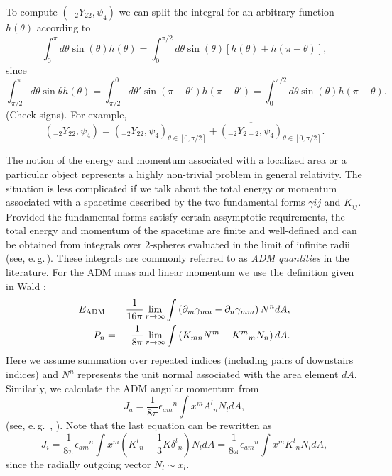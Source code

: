 \documentclass[12pt]{article}
\newcommand{\beq}{\begin{equation}}
\newcommand{\eeq}{\end{equation}}
\newcommand{\mysec}[1]{\bigskip\noindent{\bf #1}\smallskip}
\begin{document}
To compute $(\mbox{}_{-2}Y_{22}, \psi_4)$ we can split the integral
for an arbitrary function $h(\theta)$ according to
\beq
        \int_0^\pi d\theta \sin(\theta) h(\theta) =
        \int_0^{\pi/2} d\theta \sin(\theta) [h(\theta) +
        h(\pi-\theta)],
\eeq
since
\beq
        \int_{\pi/2}^{\pi} d\theta \sin\theta h(\theta) = 
        \int_{\pi/2}^0 d\theta' \sin(\pi-\theta') h(\pi-\theta') =
        \int_0^{\pi/2} d\theta \sin(\theta) h(\pi-\theta). 
\eeq
(Check signs). For example,
\beq
   (\mbox{}_{-2}Y_{22}, \psi_4) = 
   (\mbox{}_{-2}Y_{22}, \psi_4)_{\theta\in[0,\pi/2]} +
   \overline{(\mbox{}_{-2}Y_{2-2},\psi_4)}_{\theta\in[0,\pi/2]}.
\eeq


\mysec{ADM momenta}

The notion of the energy and momentum associated with a localized area or
a particular object represents a highly non-trivial problem
in general relativity.
The situation is less complicated if we talk about the total energy or
momentum associated with a spacetime described by the two fundamental
forms $\gamma{ij}$ and $K_{ij}$. Provided the fundamental forms satisfy
certain assymptotic requirements, the total energy and momentum
of the spacetime are finite and well-defined and can be obtained from
integrals over 2-spheres evaluated in the limit of infinite radii
(see, e.\,g.\,\cite{York1979}). These integrals are commonly referred
to as {\em ADM quantities} in the literature. For the ADM mass and linear
momentum we use the definition given in Wald \cite{Wald1984}:
%
\begin{eqnarray}
  E_{\rm ADM} &=& \frac{1}{16\pi} \lim_{r\rightarrow \infty} \int
     \left( \partial_m \gamma_{mn} - \partial_n \gamma_{mm} \right)
     N^n dA, \label{eqn:ADMenergy} \\
  P_n &=& \frac{1}{8\pi} \lim_{r\rightarrow \infty} \int \left(
     K_{mn} N^m - K^m{}_m N_n \right) dA. \label{eq: ADMP}
\end{eqnarray}
%
Here we assume summation over repeated indices (including pairs of
downstairs indices) and
$N^n$ represents the unit normal associated with the area element $dA$.
Similarly, we calculate the ADM angular momentum from
%
\begin{equation}
  J_a = \frac{1}{8\pi} \epsilon_{am}{}^n \int x^m A^l{}_n N_ldA,
\end{equation}
%
(see, e.\,g.\, , \cite{Yo2002}). Note that the last equation can be
rewritten as
%
\begin{equation}
  J_i = \frac{1}{8\pi} \epsilon_{am}{}^n \int x^m
     \left(K^l{}_n - \frac{1}{3} K \delta^l{}_n \right) N_ldA
      = \frac{1}{8\pi} \epsilon_{am}{}^n \int x^m K^l{}_n N_ldA,
      \label{eq: ADMJ}
\end{equation}
%
since the radially outgoing vector $N_l \sim x_l$.
\end{document}
